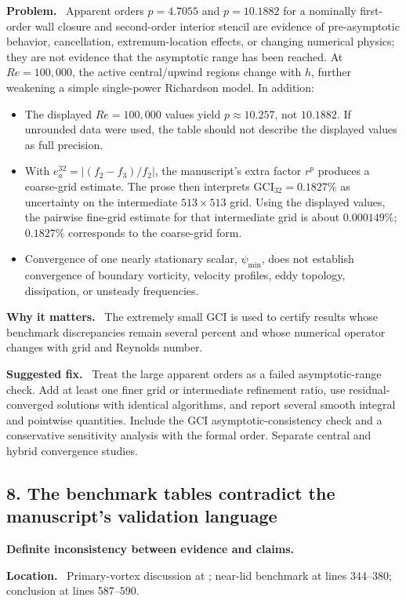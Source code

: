 \documentclass[11pt,a4paper]{article}
\newcommand{\classify}[1]{\textcolor{blue!65!black}{\textbf{#1}}}
\newcommand{\field}[1]{\par\noindent\textbf{#1}\ }
\begin{document}
\field{Problem.} Apparent orders $p=4.7055$ and $p=10.1882$ for a nominally first-order wall closure and second-order interior stencil are evidence of pre-asymptotic behavior, cancellation, extremum-location effects, or changing numerical physics; they are not evidence that the asymptotic range has been reached. At $Re=100{,}000$, the active central/upwind regions change with $h$, further weakening a simple single-power Richardson model. In addition:
\begin{itemize}
  \item The displayed $Re=100{,}000$ values yield $p\approx10.257$, not $10.1882$. If unrounded data were used, the table should not describe the displayed values as full precision.
  \item With $e_a^{32}=|(f_2-f_3)/f_2|$, the manuscript's extra factor $r^p$ produces a coarse-grid estimate. The prose then interprets $\mathrm{GCI}_{32}=0.1827\%$ as uncertainty on the intermediate $513\times513$ grid. Using the displayed values, the pairwise fine-grid estimate for that intermediate grid is about $0.000149\%$; $0.1827\%$ corresponds to the coarse-grid form.
  \item Convergence of one nearly stationary scalar, $\psi_{\min}$, does not establish convergence of boundary vorticity, velocity profiles, eddy topology, dissipation, or unsteady frequencies.
\end{itemize}

\field{Why it matters.} The extremely small GCI is used to certify results whose benchmark discrepancies remain several percent and whose numerical operator changes with grid and Reynolds number.

\field{Suggested fix.} Treat the large apparent orders as a failed asymptotic-range check. Add at least one finer grid or intermediate refinement ratio, use residual-converged solutions with identical algorithms, and report several smooth integral and pointwise quantities. Include the GCI asymptotic-consistency check and a conservative sensitivity analysis with the formal order. Separate central and hybrid convergence studies.

\subsection*{8. The benchmark tables contradict the manuscript's validation language}

\classify{Definite inconsistency between evidence and claims.}

\field{Location.} Primary-vortex discussion at ; near-lid benchmark at lines 344--380; conclusion at lines 587--590.
\end{document}
